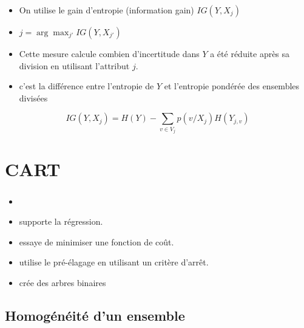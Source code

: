 \documentclass[xcolor=table]{beamer}
\begin{document}
\begin{frame}
	\frametitle{\insertsection}
	\framesubtitle{\insertsubsection}
	
	\begin{itemize}
		\item On utilise le gain d'entropie (information gain) $IG(Y, X_j)$
		\item $j = \arg\max_{j'} IG(Y, X_{j'})$
		\item Cette mesure calcule combien d'incertitude dans $Y$ a été réduite après sa division en utilisant l'attribut $j$.
		\item c'est la différence entre l'entropie de $Y$ et l'entropie pondérée des ensembles divisées
	\end{itemize}

	\[IG(Y, X_j) = H(Y) - \sum_{v \in V_j} p(v/X_j) H(Y_{j, v})\]
	
	
\end{frame}

\section{CART}

\begin{frame}
	\frametitle{\insertsection}
	
	\begin{itemize}
		\item {}
		\item supporte la régression.
		\item essaye de minimiser une fonction de coût.
		\item utilise le pré-élagage en utilisant un critère d'arrêt.
		\item crée des arbres binaires 
	\end{itemize}
	
\end{frame}

\subsection{Homogénéité d'un ensemble}
\end{document}
